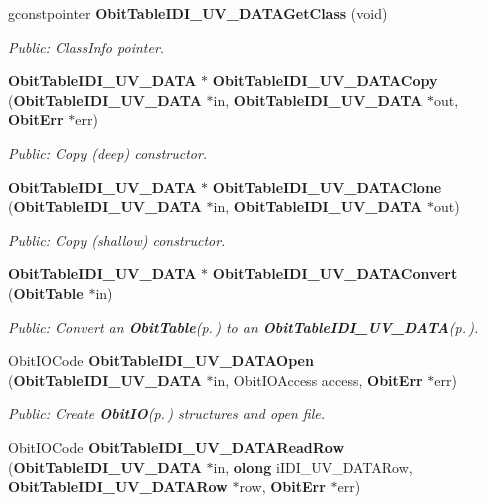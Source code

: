 \begin{CompactItemize}
gconstpointer {\bf Obit\-Table\-IDI\_\-UV\_\-DATAGet\-Class} (void)
\begin{CompactList}\small\item\em Public: Class\-Info pointer. \item\end{CompactList}\item 
{\bf Obit\-Table\-IDI\_\-UV\_\-DATA} $\ast$ {\bf Obit\-Table\-IDI\_\-UV\_\-DATACopy} ({\bf Obit\-Table\-IDI\_\-UV\_\-DATA} $\ast$in, {\bf Obit\-Table\-IDI\_\-UV\_\-DATA} $\ast$out, {\bf Obit\-Err} $\ast$err)
\begin{CompactList}\small\item\em Public: Copy (deep) constructor. \item\end{CompactList}\item 
{\bf Obit\-Table\-IDI\_\-UV\_\-DATA} $\ast$ {\bf Obit\-Table\-IDI\_\-UV\_\-DATAClone} ({\bf Obit\-Table\-IDI\_\-UV\_\-DATA} $\ast$in, {\bf Obit\-Table\-IDI\_\-UV\_\-DATA} $\ast$out)
\begin{CompactList}\small\item\em Public: Copy (shallow) constructor. \item\end{CompactList}\item 
{\bf Obit\-Table\-IDI\_\-UV\_\-DATA} $\ast$ {\bf Obit\-Table\-IDI\_\-UV\_\-DATAConvert} ({\bf Obit\-Table} $\ast$in)
\begin{CompactList}\small\item\em Public: Convert an {\bf Obit\-Table}{\rm (p.\,\pageref{structObitTable})} to an {\bf Obit\-Table\-IDI\_\-UV\_\-DATA}{\rm (p.\,\pageref{structObitTableIDI__UV__DATA})}. \item\end{CompactList}\item 
Obit\-IOCode {\bf Obit\-Table\-IDI\_\-UV\_\-DATAOpen} ({\bf Obit\-Table\-IDI\_\-UV\_\-DATA} $\ast$in, Obit\-IOAccess access, {\bf Obit\-Err} $\ast$err)
\begin{CompactList}\small\item\em Public: Create {\bf Obit\-IO}{\rm (p.\,\pageref{structObitIO})} structures and open file. \item\end{CompactList}\item 
Obit\-IOCode {\bf Obit\-Table\-IDI\_\-UV\_\-DATARead\-Row} ({\bf Obit\-Table\-IDI\_\-UV\_\-DATA} $\ast$in, {\bf olong} i\-IDI\_\-UV\_\-DATARow, {\bf Obit\-Table\-IDI\_\-UV\_\-DATARow} $\ast$row, {\bf Obit\-Err} $\ast$err)

\end{CompactItemize}
